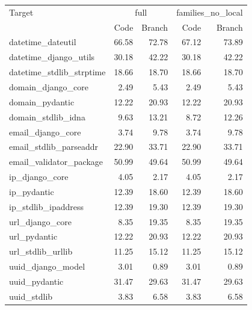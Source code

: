\begin{tabular}{lrrrr}
\toprule
Target & \multicolumn{2}{c}{full} & \multicolumn{2}{c}{families\_no\_local} \\
 & Code & Branch & Code & Branch \\
\midrule
datetime\_dateutil & 66.58 & 72.78 & 67.12 & 73.89 \\
datetime\_django\_utils & 30.18 & 42.22 & 30.18 & 42.22 \\
datetime\_stdlib\_strptime & 18.66 & 18.70 & 18.66 & 18.70 \\
domain\_django\_core & 2.49 & 5.43 & 2.49 & 5.43 \\
domain\_pydantic & 12.22 & 20.93 & 12.22 & 20.93 \\
domain\_stdlib\_idna & 9.63 & 13.21 & 8.72 & 12.26 \\
email\_django\_core & 3.74 & 9.78 & 3.74 & 9.78 \\
email\_stdlib\_parseaddr & 22.90 & 33.71 & 22.90 & 33.71 \\
email\_validator\_package & 50.99 & 49.64 & 50.99 & 49.64 \\
ip\_django\_core & 4.05 & 2.17 & 4.05 & 2.17 \\
ip\_pydantic & 12.39 & 18.60 & 12.39 & 18.60 \\
ip\_stdlib\_ipaddress & 12.39 & 19.30 & 12.39 & 19.30 \\
url\_django\_core & 8.35 & 19.35 & 8.35 & 19.35 \\
url\_pydantic & 12.22 & 20.93 & 12.22 & 20.93 \\
url\_stdlib\_urllib & 11.25 & 15.12 & 11.25 & 15.12 \\
uuid\_django\_model & 3.01 & 0.89 & 3.01 & 0.89 \\
uuid\_pydantic & 31.47 & 29.63 & 31.47 & 29.63 \\
uuid\_stdlib & 3.83 & 6.58 & 3.83 & 6.58 \\
\bottomrule
\end{tabular}
